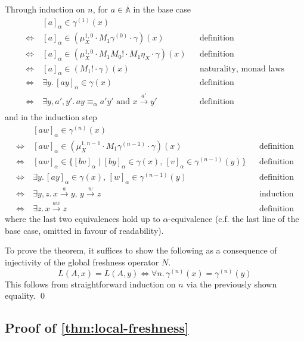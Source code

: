 \documentclass[a4paper,UKenglish,cleveref,thm-restate,numberwithinsect,final]{lipics-v2021}
\newcommand{\Names}{\mathbb{A}}
\newcommand{\barNames}{\overline{\Names}}
\newcommand{\alphaeq}{\equiv_\alpha}
\theoremstyle{plain}
\numberwithin{equation}{section}
\newcommand{\+}[1]{\mathcal{#1}\xspace}
\theoremstyle{definition}
\begin{document}
\noindent
Through induction on $n$, for $a \in \barNames$ in the base case
\begin{align*}
    &[a]_\alpha \in \gamma^{(1)}(x) \\
    \Leftrightarrow~&[a]_\alpha \in (\mu^{1,0}_X \cdot M_1\gamma^{(0)} \cdot \gamma)(x) && \text{definition} \\
    \Leftrightarrow~&[a]_\alpha \in (\mu^{1,0}_X \cdot M_1M_0! \cdot M_1\eta_X \cdot \gamma)(x) && \text{definition} \\
    \Leftrightarrow~&[a]_\alpha \in (M_1! \cdot \gamma)(x) && \text{naturality, monad laws} \\
    \Leftrightarrow~&\exists y.\, [ay]_\alpha \in \gamma(x) && \text{definition} \\
    \Leftrightarrow~&\exists y,a',y'.\, ay \alphaeq a'y' \text{ and } x \xrightarrow{a'} y' && \text{definition}\\
\end{align*}
and in the induction step
\begin{align*}
    &[aw]_\alpha \in \gamma^{(n)}(x) \\
    \Leftrightarrow~&[aw]_\alpha \in (\mu^{1,n-1}_X \cdot M_1\gamma^{(n-1)} \cdot \gamma)(x) && \text{definition} \\
    \Leftrightarrow~&[aw]_\alpha \in \{[bv]_\alpha \mid [by]_\alpha \in \gamma(x),\, [v]_\alpha \in \gamma^{(n-1)}(y)\}&& \text{definition} \\
    \Leftrightarrow~&\exists y.\, [ay]_\alpha \in \gamma(x),\, [w]_\alpha \in \gamma^{(n-1)}(y)&& \text{definition} \\
    \Leftrightarrow~&\exists y,z.\, x \xrightarrow{a} y,\, y \xrightarrow{w} z && \text{induction} \\
    \Leftrightarrow~&\exists z.\, x \xrightarrow{aw} z && \text{definition}
\end{align*}
where the last two equivalences hold up to $\alpha$-equivalence (c.f. the last line of the base case, omitted in favour of readability).

To prove the theorem, it suffices to show the following as a consequence of injectivity of the global freshness operator $N$.
\begin{equation*}
  L(A,x) = L(A,y) \Leftrightarrow \forall n.\,\gamma^{(n)}(x) = \gamma^{(n)}(y)
\end{equation*}
This follows from straightforward induction on $n$ via the previously shown equality.
\qed

\subsection*{Proof of \cref{thm:local-freshness}}
\end{document}
